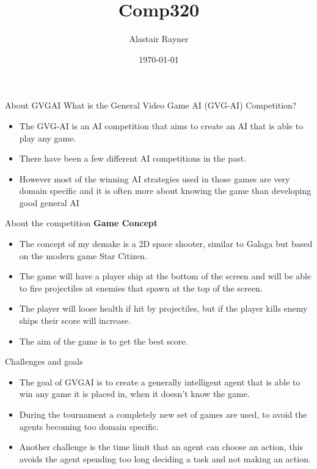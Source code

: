 \documentclass{beamer}
\title{Comp320}
\author{Alastair Rayner}
\date{\today}
\begin{document}
\maketitle


\begin{frame}{About GVGAI}
	  What is the General Video Game AI (GVG-AI) Competition? \pause
	  \begin{itemize}
	      \item The GVG-AI is an AI competition that aims to create an AI that is able to play any game. \pause
	      \item There have been a few different AI competitions in the past. \pause
	      \item However most of the winning AI strategies used in those games are very domain specific and it is often more about knowing the game than developing good general AI \pause
	  \end{itemize}
\end{frame}


\begin{frame}{About the competition}		
	\textbf{Game Concept} \pause
		\begin{itemize}
			\item The concept of my demake is a 2D space shooter, similar to Galaga but based on the modern game Star Citizen.  \pause
			\item The game will have a player ship at the bottom of the screen and will be able to fire projectiles at enemies that spawn at the top of the screen.\pause
			
			\item The player will loose health if hit by projectiles, but if the player kills enemy ships their score will increase.  \pause

			\item The aim of the game is to get the best score. \pause 	
		\end{itemize}
\end{frame}

\begin{frame}{Challenges and goals}		
			\begin{itemize}
			\item The goal of GVGAI is to create a generally intelligent agent that is able to win any game it is placed in, when it doesn't know the game.
			\item During the tournament a completely new set of games are used, to avoid the agents becoming too domain specific.
			\item Another challenge is the time limit that an agent can choose an action, this avoids the agent spending too long deciding a task and not making an action.
		\end{itemize}
\end{frame}
	
\end{document}
